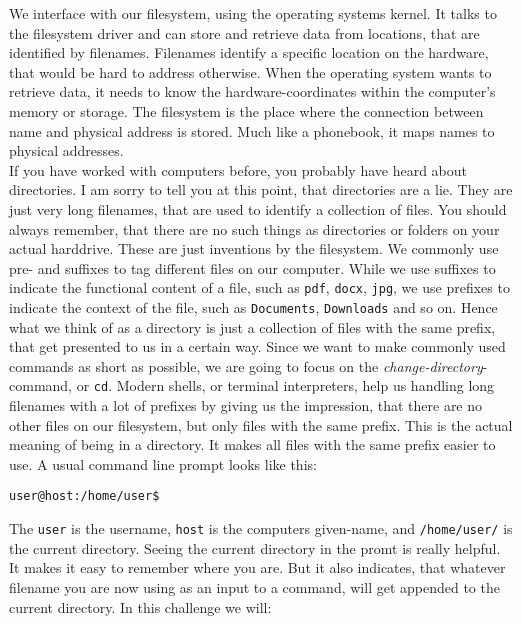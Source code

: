 \begin{challenge}
    \begin{chadescription}
    We interface with our filesystem, using the operating systems kernel. 
    It talks to the filesystem driver and can store and retrieve data from locations, that are identified by filenames.
    Filenames identify a specific location on the hardware, that would be hard to address otherwise.
    When the operating system wants to retrieve data, it needs to know the hardware-coordinates within the computer's memory or storage.
    The filesystem is the place where the connection between name and physical address is stored. 
    Much like a phonebook, it maps names to physical addresses.\\
    If you have worked with computers before, you probably have heard about directories.
    I am sorry to tell you at this point, that directories are a lie. 
    They are just very long filenames, that are used to identify a collection of files.
    You should always remember, that there are no such things as directories or folders on your actual harddrive.
    These are just inventions by the filesystem. 
    We commonly use pre- and suffixes to tag different files on our computer. 
    While we use suffixes to indicate the functional content of a file, such as \texttt{pdf}, \texttt{docx}, \texttt{jpg}, we use prefixes to indicate the context of the file, such as \texttt{Documents}, \texttt{Downloads} and so on.
    Hence what we think of as a directory is just a collection of files with the same prefix, that get presented to us in a certain way.
    Since we want to make commonly used commands as short as possible, we are going to focus on the \textit{change-directory}-command, or \texttt{cd}.
    Modern shells, or terminal interpreters, help us handling long filenames with a lot of prefixes by giving us the impression, that there are no other files on our filesystem, but only files with the same prefix.
    This is the actual meaning of being in a directory.
    It makes all files with the same prefix easier to use. 
    A usual command line prompt looks like this:
    \begin{center}
    \texttt{user@host:/home/user\$}
    \end{center}
    The \texttt{user} is the username, \texttt{host} is the computers given-name, and \texttt{/home/user/} is the current directory.
    Seeing the current directory in the promt is really helpful. 
    It makes it easy to remember where you are.
    But it also indicates, that whatever filename you are now using as an input to a command, will get appended to the current directory.
    In this challenge we will: 
    

\end{chadescription}
\end{challenge}
